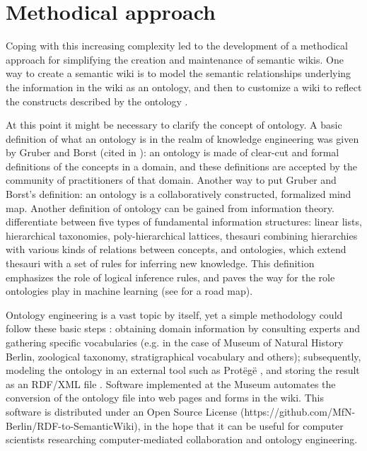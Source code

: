 \documentclass{ijcs_template}
\begin{document}
\section{Methodical approach}
Coping with this increasing complexity led to the development of a methodical approach for simplifying the creation and maintenance of semantic wikis. One way to create a semantic wiki is to model the semantic relationships underlying the information in the wiki as an ontology, and then to customize a wiki to reflect the constructs described by the ontology \cite{diiorio2006}. 

At this point it might be necessary to clarify the concept of ontology. A basic definition of what an ontology is in the realm of knowledge engineering was given by Gruber and Borst (cited in \cite{corcho2003}): an ontology is made of clear-cut and formal definitions of the concepts in a domain, and these definitions are accepted by the community of practitioners of that domain. Another way to put Gruber and Borst's definition: an ontology is a collaboratively constructed, formalized mind map.
Another definition of ontology can be gained from information theory. \citeauthor{pieterse2014} differentiate between five types of fundamental information structures: linear lists, hierarchical taxonomies, poly-hierarchical lattices, thesauri combining hierarchies with various kinds of relations between concepts, and ontologies, which extend thesauri with a set of rules for inferring new knowledge. This definition emphasizes the role of logical inference rules, and paves the way for the role ontologies play in machine learning (see \citeauthor{zhou2007} for a road map).

Ontology engineering is a vast topic by itself, yet a simple methodology could follow these basic steps \cite{noy2001}: obtaining domain information by consulting experts and gathering specific vocabularies (e.g. in the case of Museum of Natural History Berlin, zoological taxonomy, stratigraphical vocabulary and others); subsequently, modeling the ontology in an external tool such as Prot\"eg\"e \cite{musen2015}, and storing the result as an RDF/XML file \cite{gandon2014}. Software implemented at the Museum automates the conversion of the ontology file into web pages and forms in the wiki. This software is distributed under an Open Source License (https://github.com/MfN-Berlin/RDF-to-SemanticWiki), in the hope that it can be useful for computer scientists researching computer-mediated collaboration and ontology engineering.
\end{document}
